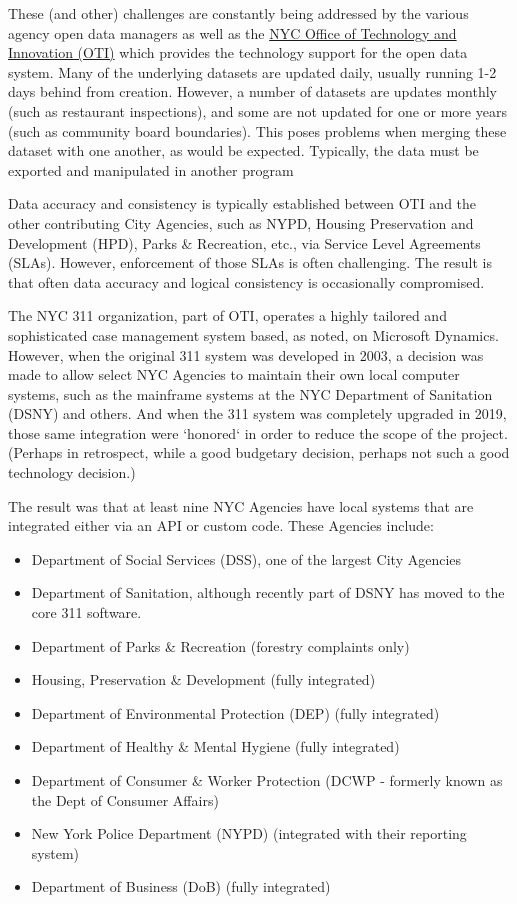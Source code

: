 \documentclass[12pt, titlepage]{article}
\begin{document}
These (and other) challenges are constantly being addressed by the various agency open data managers
as well as the \href{https://www.nyc.gov/content/oti/pages/}{NYC Office of Technology and Innovation (OTI)} which
provides the technology support for the open data system.  
Many of the underlying datasets are updated daily, usually running 1-2 days behind from creation.
However, a number of datasets are updates monthly (such as restaurant inspections), and some are
not updated for one or more years (such as community board boundaries). This poses problems when 
merging these dataset with one another, as would be expected. Typically, the data must be
exported and manipulated in another program

Data accuracy and consistency is typically established between OTI and the other contributing
City Agencies, such as NYPD, Housing Preservation and Development (HPD), Parks \& Recreation, etc.,
via Service Level Agreements (SLAs). However, enforcement of those SLAs is often challenging. The 
result is that often data accuracy and logical consistency is occasionally compromised.

The NYC 311 organization, part of OTI, operates a highly tailored and sophisticated case
management system based, as noted, on Microsoft Dynamics. However, when the original 311
system was developed in 2003, a decision was made to allow select NYC Agencies to
maintain their own local computer systems, such as the mainframe systems at the NYC Department
of Sanitation (DSNY) and others. And when the 311 system was completely upgraded in 2019, those
same integration were `honored` in order to reduce the scope of the project. (Perhaps in
retrospect, while a good budgetary decision, perhaps not such a good technology decision.)

The result was that at least nine NYC Agencies have local systems that are integrated either via
an API or custom code. These Agencies include:

\begin{itemize}
	\item Department of Social Services (DSS), one of the largest City Agencies
	\item Department of Sanitation, although recently part of DSNY has moved to the core 311 software.
	\item Department of Parks \& Recreation (forestry complaints only)
	\item Housing, Preservation \& Development (fully integrated)
	\item Department of Environmental Protection (DEP) (fully integrated)
	\item Department of Healthy \& Mental Hygiene (fully integrated) 
	\item Department of Consumer \& Worker Protection (DCWP - formerly known as the Dept of Consumer Affairs)
	\item New York Police Department (NYPD) (integrated with their reporting system)
	\item Department of Business (DoB) (fully integrated)
\end{itemize}
\end{document}
